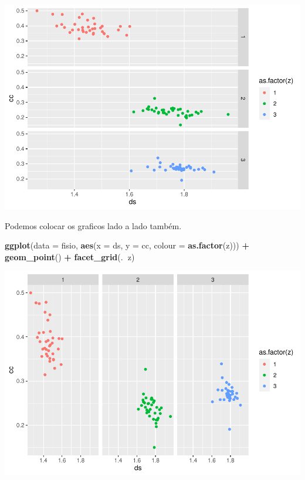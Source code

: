 \documentclass[]{book}
\newenvironment{Shaded}{\begin{snugshade}}{\end{snugshade}}
\newcommand{\DataTypeTok}[1]{\textcolor[rgb]{0.13,0.29,0.53}{#1}}
\newcommand{\KeywordTok}[1]{\textcolor[rgb]{0.13,0.29,0.53}{\textbf{#1}}}
\newcommand{\NormalTok}[1]{#1}
\newcommand{\OperatorTok}[1]{\textcolor[rgb]{0.81,0.36,0.00}{\textbf{#1}}}
\newcommand{\StringTok}[1]{\textcolor[rgb]{0.31,0.60,0.02}{#1}}
\begin{document}
\includegraphics{TudodoR_files/figure-latex/unnamed-chunk-220-1.pdf}

Podemos colocar os graficos lado a lado também.

\begin{Shaded}
\begin{Highlighting}[]
\KeywordTok{ggplot}\NormalTok{(}\DataTypeTok{data =}\NormalTok{ fisio, }\KeywordTok{aes}\NormalTok{(}\DataTypeTok{x =}\NormalTok{ ds, }\DataTypeTok{y =}\NormalTok{ cc, }\DataTypeTok{colour =} \KeywordTok{as.factor}\NormalTok{(z))) }\OperatorTok{+}
\StringTok{  }\KeywordTok{geom_point}\NormalTok{() }\OperatorTok{+}
\StringTok{  }\KeywordTok{facet_grid}\NormalTok{(.}\OperatorTok{~}\NormalTok{z)}
\end{Highlighting}
\end{Shaded}

\includegraphics{TudodoR_files/figure-latex/unnamed-chunk-221-1.pdf}
\end{document}

